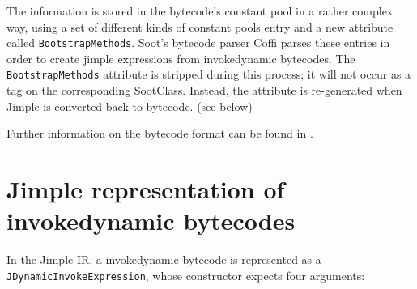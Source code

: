 \documentclass{article}
\begin{document}
The information is stored in the bytecode's constant pool in a rather complex
way, using a set of different kinds of constant pools entry and a new attribute
called \texttt{BootstrapMethods}. Soot's bytecode parser Coffi parses these
entries in order to create jimple expressions from invokedynamic bytecodes.
The \texttt{BootstrapMethods} attribute is stripped during this process; it will
not occur as a tag on the corresponding SootClass. Instead, the attribute is
re-generated when Jimple is converted back to bytecode. (see below)

Further information on the bytecode format can be found in
.

\section{Jimple representation of invokedynamic bytecodes}

In the Jimple IR, a invokedynamic bytecode is represented as a
\texttt{JDynamicInvokeExpression}, whose constructor expects four arguments:
\end{document}
